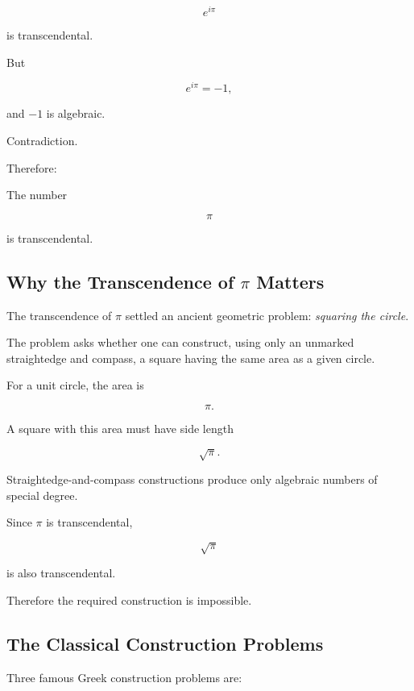 \[ e^{i\pi} \]

is transcendental.

But

\[ e^{i\pi}=-1, \]

and \(-1\) is algebraic.

Contradiction.

Therefore:

\begin{theorem}[Lindemann]
The number

\[ \boxed{\pi} \]

is transcendental.
\end{theorem}

\subsection{Why the Transcendence of \(\pi\) Matters}
\label{subsec:why-pi-transcendence-matters}

The transcendence of \(\pi\) settled an ancient geometric problem:
\emph{squaring the circle}.

The problem asks whether one can construct, using only an unmarked
straightedge and compass, a square having the same area as a given circle.

For a unit circle, the area is

\[ \pi. \]

A square with this area must have side length

\[ \sqrt\pi. \]

Straightedge-and-compass constructions produce only algebraic numbers of
special degree.

Since \(\pi\) is transcendental,

\[ \sqrt\pi \]

is also transcendental.

Therefore the required construction is impossible.

\subsection{The Classical Construction Problems}
\label{subsec:classical-construction-problems-transcendence}

Three famous Greek construction problems are:

